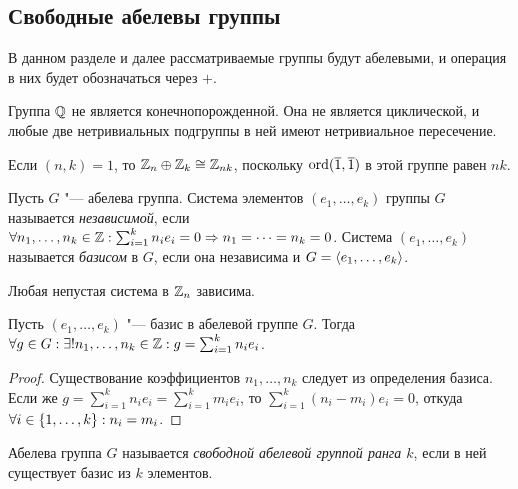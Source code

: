 \subsection{Свободные абелевы группы}

В данном разделе и далее рассматриваемые группы будут абелевыми, и операция в них будет обозначаться через $+$.

\begin{example}
	Группа $\mathbb{Q}$ не является конечнопорожденной. Она не является циклической, и любые две нетривиальных подгруппы в ней имеют нетривиальное пересечение.
\end{example}

\begin{note}
	Если $(n, k) = 1$, то $\mathbb{Z}_n \oplus \mathbb{Z}_k \cong \mathbb{Z}_{nk}$, поскольку $\operatorname{ord}(\overline{1}, \overline{1})$ в этой группе равен $nk$.
\end{note}

\begin{definition}
	Пусть $G$ "--- абелева группа. Система элементов $(e_1, \dotsc, e_k)$ группы $G$ называется \textit{независимой}, если $\forall n_1, \dotsc, n_k \in \mathbb{Z}: \sum_{i = 1}^kn_ie_i = 0 \Rightarrow n_1 = \dotsb = n_k = 0$. Система $(e_1, \dotsc, e_k)$ называется \textit{базисом} в $G$, если она независима и $G = \langle e_1, \dotsc, e_k\rangle$.
\end{definition}

\begin{note}
	Любая непустая система в $\mathbb{Z}_n$ зависима.
\end{note}

\begin{proposition}
	Пусть $(e_1, \dotsc, e_k)$ "--- базис в абелевой группе $G$. Тогда $\forall g \in G: \exists! n_1, \dotsc, n_k \in \mathbb{Z}: g = \sum_{i = 1}^kn_ie_i$.
\end{proposition}

\begin{proof}
	Существование коэффициентов $n_1, \dotsc, n_k$ следует из определения базиса. Если же $g = \sum_{i = 1}^kn_ie_i = \sum_{i = 1}^km_ie_i$, то $\sum_{i = 1}^k(n_i - m_i)e_i = 0$, откуда $\forall i \in \{1, \dotsc, k\}: n_i \hm= m_i$.
\end{proof}

\begin{definition}
	Абелева группа $G$ называется \textit{свободной абелевой группой ранга $k$}, если в ней существует базис из $k$ элементов.
\end{definition}

